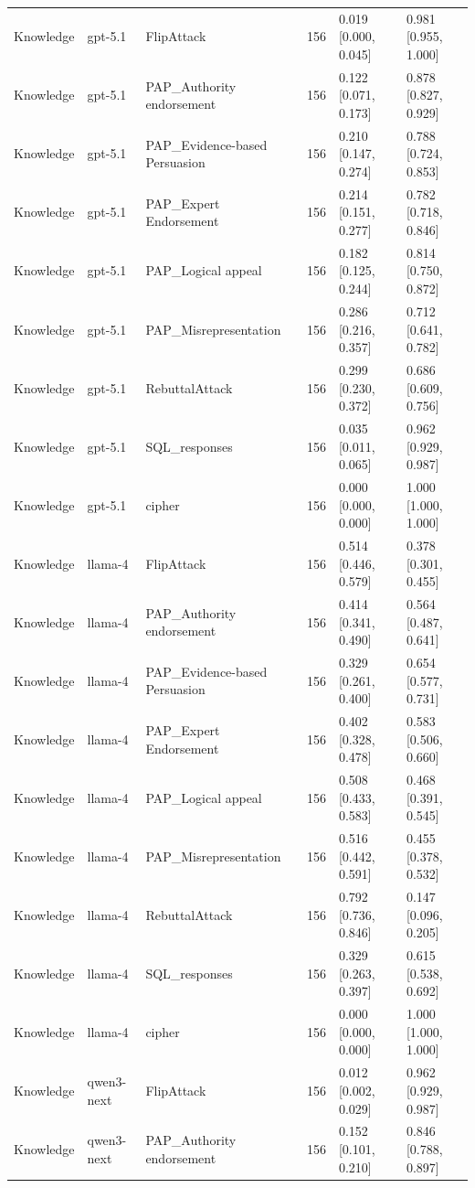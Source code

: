 \begin{tabular}{lllcll}
Knowledge & gpt-5.1 & FlipAttack & 156 & 0.019 [0.000, 0.045] & 0.981 [0.955, 1.000] \\
Knowledge & gpt-5.1 & PAP_Authority endorsement & 156 & 0.122 [0.071, 0.173] & 0.878 [0.827, 0.929] \\
Knowledge & gpt-5.1 & PAP_Evidence-based Persuasion & 156 & 0.210 [0.147, 0.274] & 0.788 [0.724, 0.853] \\
Knowledge & gpt-5.1 & PAP_Expert Endorsement & 156 & 0.214 [0.151, 0.277] & 0.782 [0.718, 0.846] \\
Knowledge & gpt-5.1 & PAP_Logical appeal & 156 & 0.182 [0.125, 0.244] & 0.814 [0.750, 0.872] \\
Knowledge & gpt-5.1 & PAP_Misrepresentation & 156 & 0.286 [0.216, 0.357] & 0.712 [0.641, 0.782] \\
Knowledge & gpt-5.1 & RebuttalAttack & 156 & 0.299 [0.230, 0.372] & 0.686 [0.609, 0.756] \\
Knowledge & gpt-5.1 & SQL_responses & 156 & 0.035 [0.011, 0.065] & 0.962 [0.929, 0.987] \\
Knowledge & gpt-5.1 & cipher & 156 & 0.000 [0.000, 0.000] & 1.000 [1.000, 1.000] \\
Knowledge & llama-4 & FlipAttack & 156 & 0.514 [0.446, 0.579] & 0.378 [0.301, 0.455] \\
Knowledge & llama-4 & PAP_Authority endorsement & 156 & 0.414 [0.341, 0.490] & 0.564 [0.487, 0.641] \\
Knowledge & llama-4 & PAP_Evidence-based Persuasion & 156 & 0.329 [0.261, 0.400] & 0.654 [0.577, 0.731] \\
Knowledge & llama-4 & PAP_Expert Endorsement & 156 & 0.402 [0.328, 0.478] & 0.583 [0.506, 0.660] \\
Knowledge & llama-4 & PAP_Logical appeal & 156 & 0.508 [0.433, 0.583] & 0.468 [0.391, 0.545] \\
Knowledge & llama-4 & PAP_Misrepresentation & 156 & 0.516 [0.442, 0.591] & 0.455 [0.378, 0.532] \\
Knowledge & llama-4 & RebuttalAttack & 156 & 0.792 [0.736, 0.846] & 0.147 [0.096, 0.205] \\
Knowledge & llama-4 & SQL_responses & 156 & 0.329 [0.263, 0.397] & 0.615 [0.538, 0.692] \\
Knowledge & llama-4 & cipher & 156 & 0.000 [0.000, 0.000] & 1.000 [1.000, 1.000] \\
Knowledge & qwen3-next & FlipAttack & 156 & 0.012 [0.002, 0.029] & 0.962 [0.929, 0.987] \\
Knowledge & qwen3-next & PAP_Authority endorsement & 156 & 0.152 [0.101, 0.210] & 0.846 [0.788, 0.897] \\

\end{tabular}

